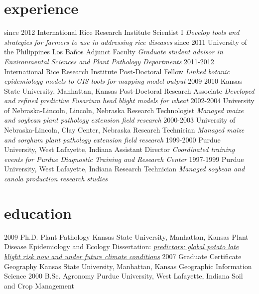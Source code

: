 \section{experience}
\begin{entrylist}
  \entry
    {since 2012}
    {International Rice Research Institute }
    {Scientist I}
    {\emph{Develop tools and strategies for farmers to use in addressing rice diseases}}
  \entry
  	{since 2011}
	{University of the Philippines Los Ba\~nos }
	{Adjunct Faculty}
	{\emph{Graduate student advisor in Environmental Sciences and Plant Pathology Departments}}
  \entry
    {2011-2012}
    {International Rice Research Institute }
    {Post-Doctoral Fellow}
    {\emph{Linked botanic epidemiology models to GIS tools for mapping model output}}
  \entry
    {2009-2010}
    {Kansas State University, Manhattan, Kansas}
    {Post-Doctoral Research Associate}
    {\emph{Developed and refined predictive Fusarium head blight models for wheat}}
  \entry
   {2002-2004}
   {University of Nebraska-Lincoln, Lincoln, Nebraska}
   {Research Technologist}
   {\emph{Managed maize and soybean plant pathology extension field research}}
  \entry
   {2000-2003}
   {University of Nebraska-Lincoln, Clay Center, Nebraska}
   {Research Technician}
   {\emph{Managed maize and sorghum plant pathology extension field research}}
  \entry
   {1999-2000}
   {Purdue University, West Lafayette, Indiana}
   {Assistant Director}
   {\emph{Coordinated training events for Purdue Diagnostic Training and Research Center}}
  \entry
   {1997-1999}
   {Purdue University, West Lafayette, Indiana}
   {Research Technician}
   {\emph{Managed soybean and canola production research studies}}
\end{entrylist}

\section{education}

\begin{entrylist}
  \entry
    {2009}
    {Ph.D. {\normalfont Plant Pathology}}
    {Kansas State University, Manhattan, Kansas}
    {Plant Disease Epidemiology and Ecology}
  \entry
    {}
    {Dissertation: }
    {}
      {\emph{\href{https://krex.k-state.edu/dspace/handle/2097/2341?show=full}{predictors: global potato late blight risk now and under future climate conditions}}}
 \entry
    {2007}
    {Graduate Certificate {\normalfont Geography}}
    {Kansas State University, Manhattan, Kansas}
    {Geographic Information Science}
  \entry
    {2000}
    {B.Sc. {\normalfont Agronomy}}
    {Purdue University, West Lafayette, Indiana}
    {Soil and Crop Management}
\end{entrylist}
